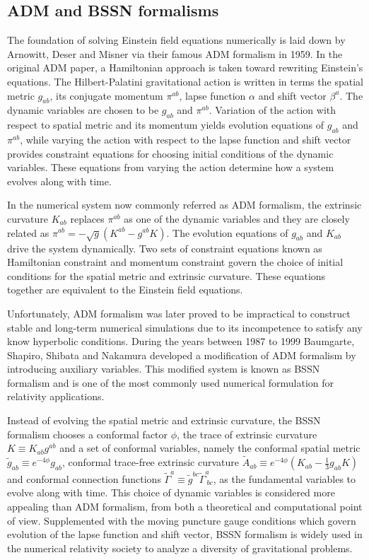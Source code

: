 \subsection{ADM and BSSN formalisms}
The foundation of solving Einstein field equations numerically is laid down by Arnowitt, Deser and Misner via their famous ADM formalism\cite{ADM:Witten} in 1959. In the original ADM paper, a Hamiltonian approach is taken toward rewriting Einstein's equations. The Hilbert-Palatini gravitational action is written in terms the spatial metric $g_{ab}$, its conjugate momentum $\pi^{ab}$, lapse function $\alpha$ and shift vector $\beta^{a}$. The dynamic variables are chosen to be $g_{ab}$ and $\pi^{ab}$. Variation of the action with respect to spatial metric and its momentum yields evolution equations of $g_{ab}$ and $\pi^{ab}$, while varying the action with respect to the lapse function and shift vector provides constraint equations for choosing initial conditions of the dynamic variables. These equations from varying the action determine how a system evolves along with time. 

In the numerical system now commonly referred as ADM formalism, the extrinsic curvature $K_{ab}$ replaces $\pi^{ab}$ as one of the dynamic variables and they are closely related as $\pi^{ab} = -\sqrt{g}(K^{ab} - g^{ab}K)$. The evolution equations of $g_{ab}$ and $K_{ab}$ drive the system dynamically. Two sets of constraint equations known as Hamiltonian constraint and momentum constraint govern the choice of initial conditions for the spatial metric and extrinsic curvature. These equations together are equivalent to the Einstein field equations. 

Unfortunately, ADM formalism was later proved to be impractical to construct stable and long-term numerical simulations due to its incompetence to satisfy any know hyperbolic conditions. During the years between 1987 to 1999 Baumgarte, Shapiro, Shibata and Nakamura\cite{Shibata:1995we, Baumgarte:1998te} developed a modification of ADM formalism by introducing auxiliary variables. This modified system is known as BSSN formalism and is one of the most commonly used numerical formulation for relativity applications. 

Instead of evolving the spatial metric and extrinsic curvature, the BSSN formalism chooses a conformal factor $\phi$, the trace of extrinsic curvature $K \equiv K_{ab}g^{ab}$ and a set of conformal variables, namely the conformal spatial metric ${\tilde g}_{ab} \equiv e^{-4\phi}g_{ab}$, conformal trace-free extrinsic curvature ${\tilde A}_{ab} \equiv e^{-4\phi}(K_{ab} - \frac{1}{3}g_{ab}K)$ and conformal connection functions ${\tilde \Gamma}^{a} \equiv {\tilde g}^{bc}{\tilde \Gamma}^{a}_{~bc}$, as the fundamental variables to evolve along with time. This choice of dynamic variables is considered more appealing than ADM formalism, from both a theoretical and computational point of view. Supplemented with the moving puncture gauge conditions which govern evolution of the lapse function and shift vector, BSSN formalism is widely used in the numerical relativity society to analyze a diversity of gravitational problems. 

